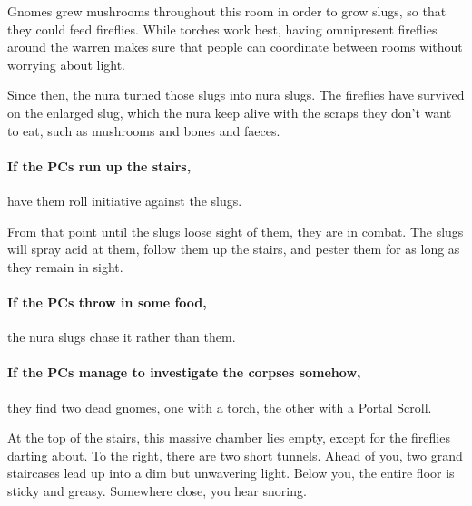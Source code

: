 \begin{multicols}{2}
\begin{boxtext}
\end{boxtext}

\begin{exampletext}

Gnomes grew mushrooms throughout this room in order to grow slugs, so that they could feed fireflies.
While torches work best, having omnipresent fireflies around the warren makes sure that people can coordinate between rooms without worrying about light.

Since then, the nura turned those slugs into nura slugs.
The fireflies have survived on the enlarged slug, which the nura keep alive with the scraps they don't want to eat, such as mushrooms and bones and faeces.

\end{exampletext}

\paragraph{If the PCs run up the stairs,}
have them roll initiative against the slugs.

From that point until the slugs loose sight of them, they are in combat.
The slugs will spray acid at them, follow them up the stairs, and pester them for as long as they remain in sight.

\paragraph{If the PCs throw in some food,}
the nura slugs chase it rather than them.

\paragraph{If the PCs manage to investigate the corpses somehow,}
they find two dead gnomes, one with a torch, the other with a Portal Scroll.



\begin{boxtext}

	At the top of the stairs, this massive chamber lies empty, except for the fireflies darting about.
	To the right, there are two short tunnels.
	Ahead of you, two grand staircases lead up into a dim but unwavering light.
	Below you, the entire floor is sticky and greasy.
	Somewhere close, you hear snoring.

\end{boxtext}


\end{multicols}
